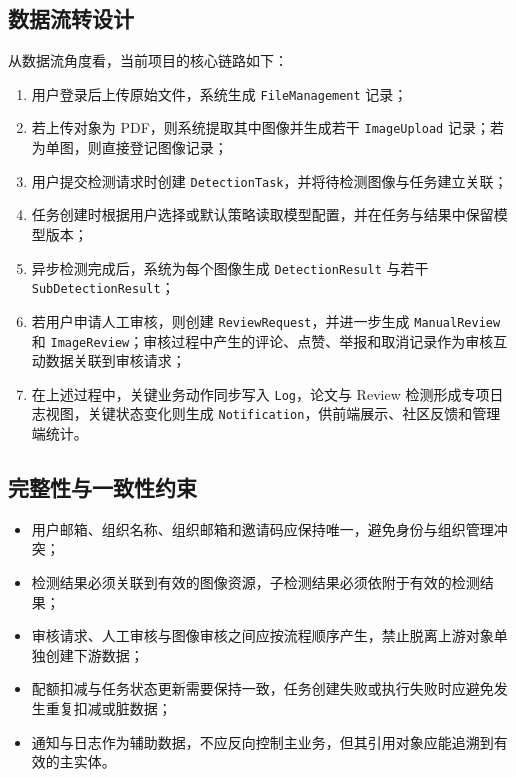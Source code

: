 \subsection{数据流转设计}
从数据流角度看，当前项目的核心链路如下：
\begin{enumerate}[leftmargin=2em]
    \item 用户登录后上传原始文件，系统生成 \texttt{FileManagement} 记录；
    \item 若上传对象为 PDF，则系统提取其中图像并生成若干 \texttt{ImageUpload} 记录；若为单图，则直接登记图像记录；
    \item 用户提交检测请求时创建 \texttt{DetectionTask}，并将待检测图像与任务建立关联；
    \item 任务创建时根据用户选择或默认策略读取模型配置，并在任务与结果中保留模型版本；
    \item 异步检测完成后，系统为每个图像生成 \texttt{DetectionResult} 与若干 \texttt{SubDetectionResult}；
    \item 若用户申请人工审核，则创建 \texttt{ReviewRequest}，并进一步生成 \texttt{ManualReview} 和 \texttt{ImageReview}；审核过程中产生的评论、点赞、举报和取消记录作为审核互动数据关联到审核请求；
    \item 在上述过程中，关键业务动作同步写入 \texttt{Log}，论文与 Review 检测形成专项日志视图，关键状态变化则生成 \texttt{Notification}，供前端展示、社区反馈和管理端统计。
\end{enumerate}

\subsection{完整性与一致性约束}
\begin{itemize}[leftmargin=2em]
    \item 用户邮箱、组织名称、组织邮箱和邀请码应保持唯一，避免身份与组织管理冲突；
    \item 检测结果必须关联到有效的图像资源，子检测结果必须依附于有效的检测结果；
    \item 审核请求、人工审核与图像审核之间应按流程顺序产生，禁止脱离上游对象单独创建下游数据；
    \item 配额扣减与任务状态更新需要保持一致，任务创建失败或执行失败时应避免发生重复扣减或脏数据；
    \item 通知与日志作为辅助数据，不应反向控制主业务，但其引用对象应能追溯到有效的主实体。
\end{itemize}


